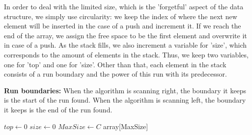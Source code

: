 \documentclass{article}
\begin{document}
\noindent In order to deal with the limited size, which is the 'forgetful' aspect of the data structure,
we simply use circularity: we keep the index of where the next new element will be inserted in the case of a push and
increment it. If we reach the end of the array, we assign the free space to be the first element and overwrite it in case of a push.
As the stack fills, we also increment a variable for 'size', which corresponds to the amount of elements in the stack. 
Thus, we keep two variables, one for 'top' and one for 'size'. Other than that, each element in the stack consists
of a run boundary and the power of this run with its predecessor.

\noindent\textbf{Run boundaries:} When the algorithm is scanning right, the boundary it keeps is the start of the run found. 
When the algorithm is scanning left, the boundary it keeps is the end of the run found.
\begin{algorithm2e}
\caption{C-Bounded Stack(C)}\label{cstack}

$top \gets 0$\; $size \gets 0$
$MaxSize \gets C$
array[MaxSize]
\end{algorithm2e}
\newpage

\printbibliography
\end{document}
